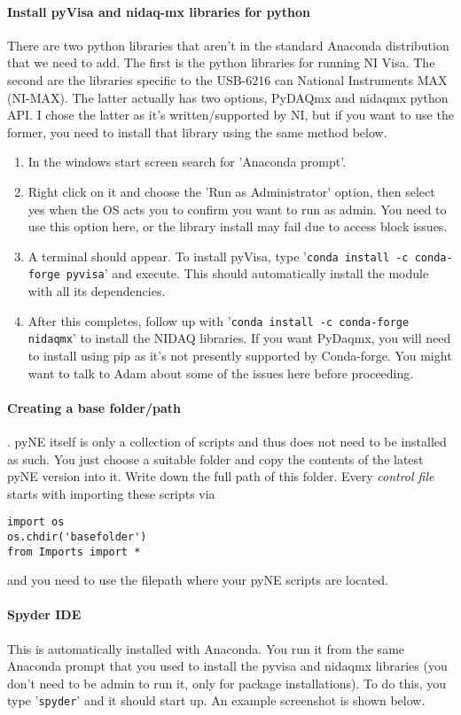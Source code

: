 \paragraph*{Install pyVisa and nidaq-mx libraries for python}
There are two python libraries that aren't in the standard Anaconda distribution that we need to add. The first is the python libraries for running NI Visa. The second are the libraries specific to the USB-6216 can National Instruments MAX (NI-MAX). The latter actually has two options, PyDAQmx and nidaqmx python API. I chose the latter as it's written/supported by NI, but if you want to use the former, you need to install that library using the same method below.
\begin{enumerate}
\item In the windows start screen search for 'Anaconda prompt'.
\item Right click on it and choose the 'Run as Administrator' option, then select yes when the OS acts you to confirm you want to run as admin. You need to use this option here, or the library install may fail due to access block issues.
\item A terminal should appear. To install pyVisa, type '\texttt{conda install -c conda-forge pyvisa}' and execute. This should automatically install the module with all its dependencies.
\item After this completes, follow up with '\texttt{conda install -c conda-forge nidaqmx}' to install the NIDAQ libraries. If you want PyDaqmx, you will need to install using pip as it's not presently supported by Conda-forge. You might want to talk to Adam about some of the issues here before proceeding.
\end{enumerate}

\paragraph*{Creating a base folder/path}. pyNE itself is only a collection of scripts and thus does not need to be installed as such. You just choose a suitable folder and copy the contents of the latest pyNE version into it. Write down the full path of this folder. Every \textit{control file} starts with importing these scripts via
\begin{verbatim}
import os
os.chdir('basefolder')
from Imports import *
\end{verbatim}
and you need to use the filepath where your pyNE scripts are located.

\paragraph*{Spyder IDE}
This is automatically installed with Anaconda. You run it from the same Anaconda prompt that you used to install the pyvisa and nidaqmx libraries (you don't need to be admin to run it, only for package installations). To do this, you type '\texttt{spyder}' and it should start up. An example screenshot is shown below.\\

